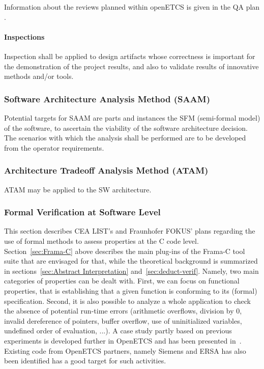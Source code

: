\documentclass{template/openetcs_report}
\begin{document}
Information about the reviews planned within openETCS is given in the
QA plan \cite{QAplan}.

\paragraph{Inspections}
Inspection shall be applied to design artifacts whose correctness
is important for the demonstration of the project results, and also
to validate results of innovative \vv methods and/or tools.


\subsubsection{Software Architecture Analysis Method (SAAM)}
\label{sec:saam-openETCS}
Potential targets for SAAM are parts and instances the SFM 
(semi-formal model) of the software, to ascertain the 
viability of the software architecture decision. The scenarios 
with which the analysis shall be performed are to be developed
from the operator requirements.

\subsubsection{Architecture Tradeoff Analysis Method (ATAM)}	
\label{sec:atam-openETCS}
ATAM may be applied to the SW architecture.

\subsubsection{Formal Verification at Software Level}
\label{sec:form-verif-soft-openETCS}
This section describes CEA LIST's and Fraunhofer FOKUS' plans regarding the use
of formal methods to assess properties at the C code level. 
Section~\ref{sec:Frama-C} above describes the main plug-ins of the Frama-C
tool suite that are envisaged for that, while the theoretical background is
summarized in sections~\ref{sec:Abstract Interpretation}
and~\ref{sec:deduct-verif}. Namely, two main categories of properties
can be dealt with. First, we can focus on functional properties, that is
establishing that a given function is conforming to its (formal) specification.
Second, it is also possible to analyze a whole application to check the absence
of potential run-time errors (arithmetic overflows, division by 0, invalid
dereference of pointers, buffer overflow, use of uninitialized variables,
undefined order of evaluation, ...). A case study partly based on previous
experiments is developed further in OpenETCS and has been presented
in~\cite{Gerlach.2013}. Existing code from OpenETCS partners,
namely Siemens and ERSA has also been identified has a good target for
such activities.
\end{document}
